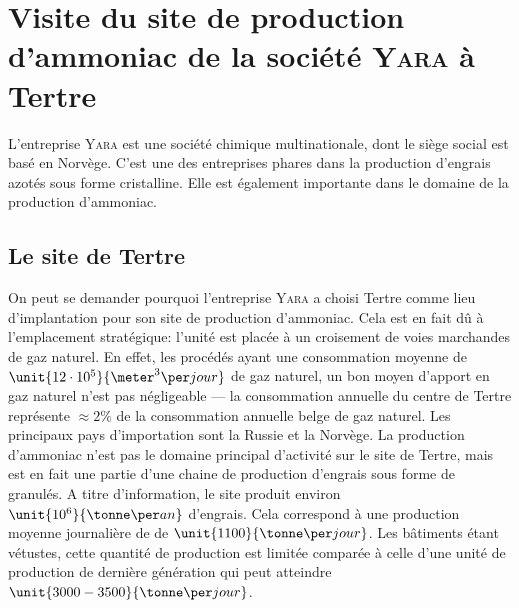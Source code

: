 \section{Visite du site de production d'ammoniac de la société \textsc{Yara} à Tertre}

L'entreprise \textsc{Yara} est une société chimique multinationale, dont le siège social est basé en Norvège. C'est une des entreprises phares dans la production d'engrais azotés sous forme cristalline. Elle est également importante dans le domaine de la production d'ammoniac.

\subsection{Le site de Tertre}
On peut se demander pourquoi l'entreprise \textsc{Yara} a choisi Tertre comme lieu d'implantation pour son site de production d'ammoniac. Cela est en fait dû à l'emplacement stratégique: l'unité est placée à un croisement de voies marchandes de gaz naturel. En effet, les procédés ayant une consommation moyenne de $\unit{12 \cdot 10^5}{\meter^3\per jour}$ de gaz naturel, un bon moyen d'apport en gaz naturel n'est pas négligeable --- la consommation annuelle du centre de Tertre représente $\approx 2\%$ de la consommation annuelle belge de gaz naturel. Les principaux pays d'importation sont la Russie et la Norvège. La production d'ammoniac n'est pas le domaine principal d'activité sur le site de Tertre, mais est en fait une partie d'une chaine de production d'engrais sous forme de granulés. A titre d'information, le site produit environ $\unit{10^6}{\tonne\per an}$ d'engrais. Cela correspond à une production moyenne journalière de  de $\unit{1100}{\tonne\per jour}$. Les bâtiments étant vétustes, cette quantité de production est limitée comparée à celle d'une unité de production de dernière génération qui peut atteindre $\unit{3000-3500}{\tonne\per jour}$. 

